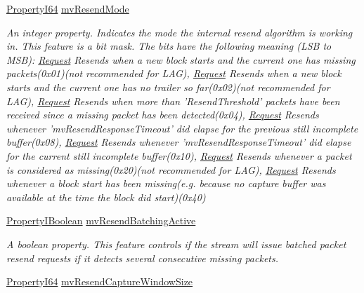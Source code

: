 \begin{DoxyCompactItemize}
\hyperlink{group___common_interface_ga81749b2696755513663492664a18a893}{Property\+I64} \hyperlink{classmv_i_m_p_a_c_t_1_1acquire_1_1_gen_i_cam_1_1_data_stream_module_af1254901b3e7ae569d1688ae609132b6}{mv\+Resend\+Mode}
\begin{DoxyCompactList}\small\item\em An integer property. Indicates the mode the internal resend algorithm is working in. This feature is a bit mask. The bits have the following meaning (L\+S\+B to M\+S\+B)\+: \hyperlink{classmv_i_m_p_a_c_t_1_1acquire_1_1_request}{Request} Resends when a new block starts and the current one has missing packets(0x01)(not recommended for L\+A\+G), \hyperlink{classmv_i_m_p_a_c_t_1_1acquire_1_1_request}{Request} Resends when a new block starts and the current one has no trailer so far(0x02)(not recommended for L\+A\+G), \hyperlink{classmv_i_m_p_a_c_t_1_1acquire_1_1_request}{Request} Resends when more than 'Resend\+Threshold' packets have been received since a missing packet has been detected(0x04), \hyperlink{classmv_i_m_p_a_c_t_1_1acquire_1_1_request}{Request} Resends whenever 'mv\+Resend\+Response\+Timeout' did elapse for the previous still incomplete buffer(0x08), \hyperlink{classmv_i_m_p_a_c_t_1_1acquire_1_1_request}{Request} Resends whenever 'mv\+Resend\+Response\+Timeout' did elapse for the current still incomplete buffer(0x10), \hyperlink{classmv_i_m_p_a_c_t_1_1acquire_1_1_request}{Request} Resends whenever a packet is considered as missing(0x20)(not recommended for L\+A\+G), \hyperlink{classmv_i_m_p_a_c_t_1_1acquire_1_1_request}{Request} Resends whenever a block start has been missing(e.\+g. because no capture buffer was available at the time the block did start)(0x40) \end{DoxyCompactList}\item 
\hyperlink{group___common_interface_ga44f9437e24b21b6c93da9039ec6786aa}{Property\+I\+Boolean} \hyperlink{classmv_i_m_p_a_c_t_1_1acquire_1_1_gen_i_cam_1_1_data_stream_module_a363a6f5efc816a87ce1b9fac3548e69f}{mv\+Resend\+Batching\+Active}
\begin{DoxyCompactList}\small\item\em A boolean property. This feature controls if the stream will issue batched packet resend requests if it detects several consecutive missing packets. \end{DoxyCompactList}\item 
\hyperlink{group___common_interface_ga81749b2696755513663492664a18a893}{Property\+I64} \hyperlink{classmv_i_m_p_a_c_t_1_1acquire_1_1_gen_i_cam_1_1_data_stream_module_a99ef2f34ba6cab3607cd73a393ac30ae}{mv\+Resend\+Capture\+Window\+Size}

\end{DoxyCompactItemize}
